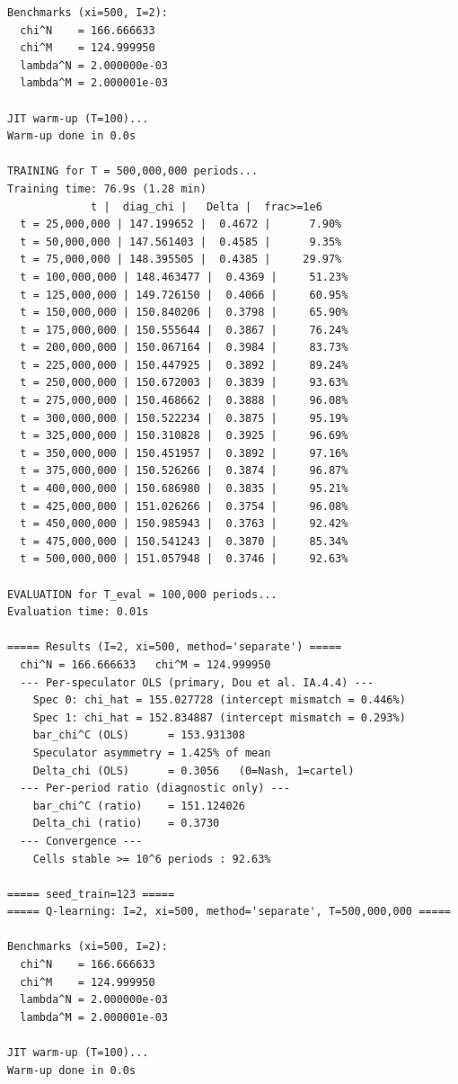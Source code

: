 \begin{lstlisting}[style=outputstyle]
Benchmarks (xi=500, I=2):
  chi^N    = 166.666633
  chi^M    = 124.999950
  lambda^N = 2.000000e-03
  lambda^M = 2.000001e-03

JIT warm-up (T=100)...
Warm-up done in 0.0s

TRAINING for T = 500,000,000 periods...
Training time: 76.9s (1.28 min)
             t |  diag_chi |   Delta |  frac>=1e6
  t = 25,000,000 | 147.199652 |  0.4672 |      7.90%
  t = 50,000,000 | 147.561403 |  0.4585 |      9.35%
  t = 75,000,000 | 148.395505 |  0.4385 |     29.97%
  t = 100,000,000 | 148.463477 |  0.4369 |     51.23%
  t = 125,000,000 | 149.726150 |  0.4066 |     60.95%
  t = 150,000,000 | 150.840206 |  0.3798 |     65.90%
  t = 175,000,000 | 150.555644 |  0.3867 |     76.24%
  t = 200,000,000 | 150.067164 |  0.3984 |     83.73%
  t = 225,000,000 | 150.447925 |  0.3892 |     89.24%
  t = 250,000,000 | 150.672003 |  0.3839 |     93.63%
  t = 275,000,000 | 150.468662 |  0.3888 |     96.08%
  t = 300,000,000 | 150.522234 |  0.3875 |     95.19%
  t = 325,000,000 | 150.310828 |  0.3925 |     96.69%
  t = 350,000,000 | 150.451957 |  0.3892 |     97.16%
  t = 375,000,000 | 150.526266 |  0.3874 |     96.87%
  t = 400,000,000 | 150.686980 |  0.3835 |     95.21%
  t = 425,000,000 | 151.026266 |  0.3754 |     96.08%
  t = 450,000,000 | 150.985943 |  0.3763 |     92.42%
  t = 475,000,000 | 150.541243 |  0.3870 |     85.34%
  t = 500,000,000 | 151.057948 |  0.3746 |     92.63%

EVALUATION for T_eval = 100,000 periods...
Evaluation time: 0.01s

===== Results (I=2, xi=500, method='separate') =====
  chi^N = 166.666633   chi^M = 124.999950
  --- Per-speculator OLS (primary, Dou et al. IA.4.4) ---
    Spec 0: chi_hat = 155.027728 (intercept mismatch = 0.446%)
    Spec 1: chi_hat = 152.834887 (intercept mismatch = 0.293%)
    bar_chi^C (OLS)      = 153.931308
    Speculator asymmetry = 1.425% of mean
    Delta_chi (OLS)      = 0.3056   (0=Nash, 1=cartel)
  --- Per-period ratio (diagnostic only) ---
    bar_chi^C (ratio)    = 151.124026
    Delta_chi (ratio)    = 0.3730
  --- Convergence ---
    Cells stable >= 10^6 periods : 92.63%

===== seed_train=123 =====
===== Q-learning: I=2, xi=500, method='separate', T=500,000,000 =====

Benchmarks (xi=500, I=2):
  chi^N    = 166.666633
  chi^M    = 124.999950
  lambda^N = 2.000000e-03
  lambda^M = 2.000001e-03

JIT warm-up (T=100)...
Warm-up done in 0.0s


\end{lstlisting}
